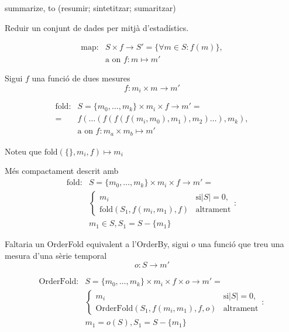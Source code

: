 summarize, to (resumir; sintetitzar; sumaritzar)

Reduir un conjunt de dades per mitjà d'estadístics.



\begin{align*}
  \text{map}:& S \times f \longrightarrow S' = \{\forall m\in S : f(m) \}, \\
             & \text{a on } f: m \mapsto m' 
\end{align*}



Sigui $f$ una funció de dues mesures 
\[
f: m_i \times m \longrightarrow m' 
\]

\begin{align*}
  \text{fold}: & S=\{m_0,\dotsc,m_k\} \times m_i \times f \longrightarrow m'= \\
               =& f(\dots(f(f(f(m_i,m_0),m_1),m_2)\dots),m_k), \\
               & \text{a on } f: m_a \times m_b \mapsto m'
\end{align*}

Noteu que $\text{fold}(\{\},m_i,f) \mapsto m_i$ 

Més compactament descrit amb
\begin{align*}
  \text{fold}: & S=\{m_0,\dotsc,m_k\} \times m_i \times f \longrightarrow m'= \\
  & \begin{cases}
    m_i & \text{si} |S|=0, \\
    \text{fold}(S_1,f(m_i,m_1),f) & \text{altrament}
  \end{cases}:\\
  & m_1 \in S, S_1 = S - \{m_1\}
\end{align*}



Faltaria un OrderFold equivalent a l'OrderBy, sigui $o$ una funció que treu una mesura d'una sèrie temporal
\[
o: S \longrightarrow m'
\]


\begin{align*}
  \text{OrderFold}: & S=\{m_0,\dotsc,m_k\} \times m_i \times f \times o \longrightarrow m'= \\
  & \begin{cases}
    m_i & \text{si} |S|=0, \\
    \text{OrderFold}(S_1,f(m_i,m_1),f,o) & \text{altrament}
  \end{cases}:\\
  & m_1 = o(S), S_1 = S - \{m_1\}
\end{align*}

